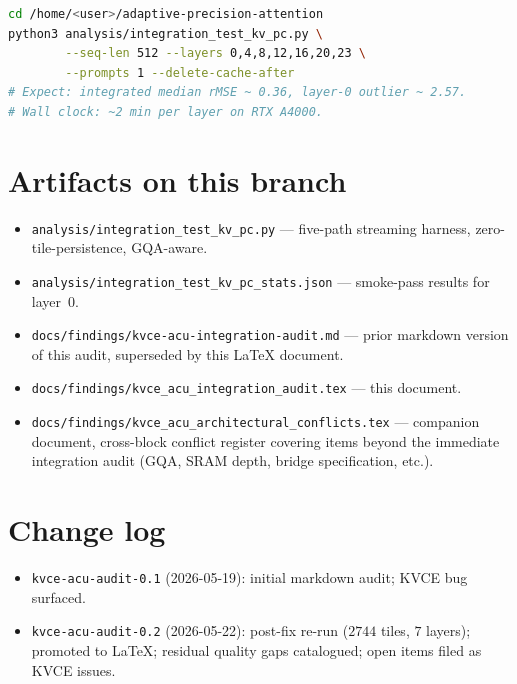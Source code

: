 \documentclass[11pt]{article}
\begin{document}
\begin{lstlisting}[language=bash,basicstyle=\ttfamily\small]
cd /home/<user>/adaptive-precision-attention
python3 analysis/integration_test_kv_pc.py \
        --seq-len 512 --layers 0,4,8,12,16,20,23 \
        --prompts 1 --delete-cache-after
# Expect: integrated median rMSE ~ 0.36, layer-0 outlier ~ 2.57.
# Wall clock: ~2 min per layer on RTX A4000.
\end{lstlisting}

\section{Artifacts on this branch}
\label{sec:artifacts}

\begin{itemize}
\item \texttt{analysis/integration\_test\_kv\_pc.py} --- five-path
streaming harness, zero-tile-persistence, GQA-aware.
\item \texttt{analysis/integration\_test\_kv\_pc\_stats.json} ---
smoke-pass results for layer~$0$.
\item \texttt{docs/findings/kvce-acu-integration-audit.md} ---
prior markdown version of this audit, superseded by this LaTeX
document.
\item \texttt{docs/findings/kvce\_acu\_integration\_audit.tex} ---
this document.
\item \texttt{docs/findings/kvce\_acu\_architectural\_conflicts.tex} ---
companion document, cross-block conflict register covering items
beyond the immediate integration audit (GQA, SRAM depth, bridge
specification, etc.).
\end{itemize}

\section*{Change log}

\begin{itemize}
\item \texttt{kvce-acu-audit-0.1} (2026-05-19): initial markdown
audit; KVCE bug surfaced.
\item \texttt{kvce-acu-audit-0.2} (2026-05-22): post-fix re-run
($2744$ tiles, $7$ layers); promoted to LaTeX; residual quality
gaps catalogued; open items filed as KVCE issues.
\end{itemize}
\end{document}

